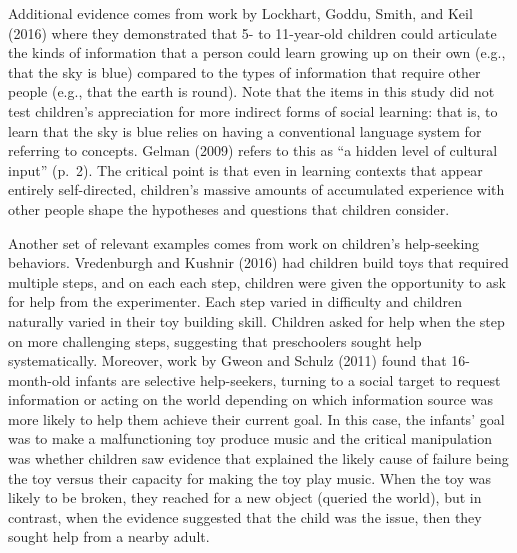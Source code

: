 \documentclass[english,floatsintext,man]{apa6}
\theoremstyle{definition}
\theoremstyle{definition}
\theoremstyle{definition}
\theoremstyle{remark}
\begin{document}
Additional evidence comes from work by Lockhart, Goddu, Smith, and Keil
(2016) where they demonstrated that 5- to 11-year-old children could
articulate the kinds of information that a person could learn growing up
on their own (e.g., that the sky is blue) compared to the types of
information that require other people (e.g., that the earth is round).
Note that the items in this study did not test children's appreciation
for more indirect forms of social learning: that is, to learn that the
sky is blue relies on having a conventional language system for
referring to concepts. Gelman (2009) refers to this as \enquote{a hidden
level of cultural input} (p.~2). The critical point is that even in
learning contexts that appear entirely self-directed, children's massive
amounts of accumulated experience with other people shape the hypotheses
and questions that children consider.

Another set of relevant examples comes from work on children's
help-seeking behaviors. Vredenburgh and Kushnir (2016) had children
build toys that required multiple steps, and on each each step, children
were given the opportunity to ask for help from the experimenter. Each
step varied in difficulty and children naturally varied in their toy
building skill. Children asked for help when the step on more
challenging steps, suggesting that preschoolers sought help
systematically. Moreover, work by Gweon and Schulz (2011) found that
16-month-old infants are selective help-seekers, turning to a social
target to request information or acting on the world depending on which
information source was more likely to help them achieve their current
goal. In this case, the infants' goal was to make a malfunctioning toy
produce music and the critical manipulation was whether children saw
evidence that explained the likely cause of failure being the toy versus
their capacity for making the toy play music. When the toy was likely to
be broken, they reached for a new object (queried the world), but in
contrast, when the evidence suggested that the child was the issue, then
they sought help from a nearby adult.
\end{document}
